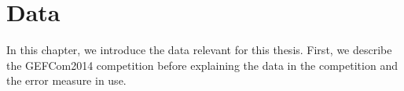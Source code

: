 \chapter{Data}
\label{ch:data}

In this chapter, we introduce the data relevant for this thesis. 
First, we describe the GEFCom2014 competition before explaining  
the data in the competition and the error measure in use. 


